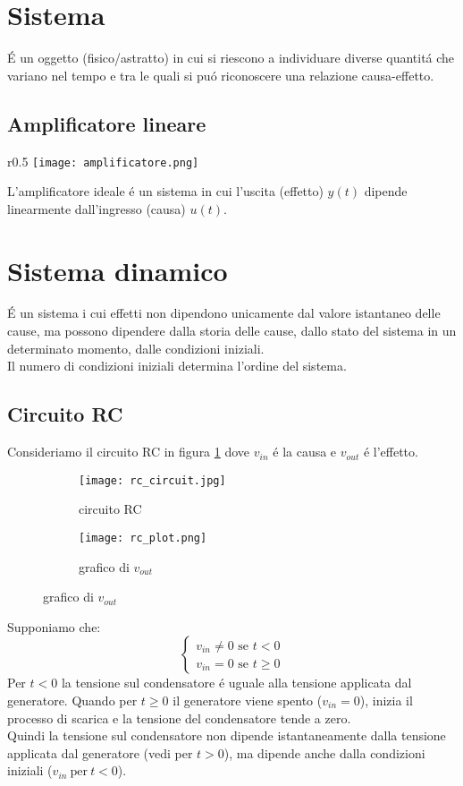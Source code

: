\documentclass[../main.tex]{subfiles}
\begin{document}
	\section{Sistema} \'E un oggetto (fisico/astratto) in cui si riescono a individuare diverse quantit\'a che variano nel tempo e tra le quali si pu\'o riconoscere una relazione causa-effetto.
	\subsection{Amplificatore lineare}
	\begin{wrapfigure}{r}{0.5\linewidth}%
		\vspace{-40pt}
		\texttt{[image: amplificatore.png]}
	\end{wrapfigure}
	L'amplificatore ideale \'e un sistema in cui l'uscita (effetto) $y(t)$ dipende linearmente dall'ingresso (causa) $u(t)$.
	\section{Sistema dinamico} \'E un sistema i cui effetti non dipendono unicamente dal valore istantaneo delle cause, ma possono dipendere dalla storia delle cause, dallo stato del sistema in un determinato momento, dalle condizioni iniziali.\\
	Il numero di condizioni iniziali determina l'ordine del sistema.
	\subsection{Circuito RC} 
	Consideriamo il circuito RC in figura \ref{circuit:rc} dove $v_{in}$ \'e la causa e $v_{out}$ \'e l'effetto.
	\begin{figure}[h!]
		\centering
		\begin{subfigure}{0.48\linewidth}
			\texttt{[image: rc\_circuit.jpg]}
			\caption{circuito RC}
			\label{circuit:rc}
		\end{subfigure}
		\begin{subfigure}{0.48\linewidth}
			\texttt{[image: rc\_plot.png]}
			\caption{grafico di $v_{out}$}
			\label{graph:rc}
		\end{subfigure}
	\end{figure}
	\newpage%
	Supponiamo che: 
	\[
	\begin{cases}
		v_{in}\neq0 \mbox{ se } t<0\\
		v_{in}=0 \mbox{ se } t\geq0
	\end{cases}
	\]%
	Per $ t<0 $ la tensione sul condensatore \'e uguale alla tensione applicata dal generatore. Quando per $ t\geq0 $ il generatore viene spento ($ v_{in}=0 $), inizia il processo di scarica e la tensione del condensatore tende a zero.\\
	Quindi la tensione sul condensatore non dipende istantaneamente dalla tensione applicata dal generatore (vedi per $ t>0 $), ma dipende anche dalla condizioni iniziali ($ v_{in}\ \mbox{per}\ t<0$).
\end{document}
